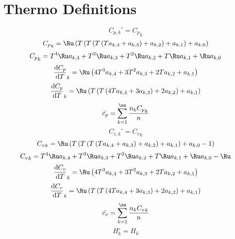 \documentclass[a4paper,10pt]{article}
\begin{document}
\section{Thermo Definitions}
\begin{dmath} {C_{p,k}}^{\circ} = {C_p}_{k}\end{dmath} 
\begin{dmath} {C_p}_{k} = \Ru \left(T \left(T \left(T \left(T a_{k,4} + a_{k,3}\right) + a_{k,2}\right) + a_{k,1}\right) + a_{k,0}\right)\end{dmath} 
\begin{dmath} {C_p}_{k} = T^{4} \Ru a_{k,4} + T^{3} \Ru a_{k,3} + T^{2} \Ru a_{k,2} + T \Ru a_{k,1} + \Ru a_{k,0}\end{dmath} 
\begin{dmath} \frac{\text{d} {C_p} }{\text{d} T }_{k} = \Ru \left(4 T^{3} a_{k,4} + 3 T^{2} a_{k,3} + 2 T a_{k,2} + a_{k,1}\right)\end{dmath} 
\begin{dmath} \frac{\text{d} {C_p} }{\text{d} T }_{k} = \Ru \left(T \left(T \left(4 T a_{k,4} + 3 a_{k,3}\right) + 2 a_{k,2}\right) + a_{k,1}\right)\end{dmath} 
\begin{dmath} \bar{c_p} = \sum_{k=1}^{\ns} \frac{n_{k} {C_p}_{k}}{n}\end{dmath} 
\begin{dmath} {C_{v,k}}^{\circ} = {C_v}_{k}\end{dmath} 
\begin{dmath} {C_v}_{k} = \Ru \left(T \left(T \left(T \left(T a_{k,4} + a_{k,3}\right) + a_{k,2}\right) + a_{k,1}\right) + a_{k,0} - 1\right)\end{dmath} 
\begin{dmath} {C_v}_{k} = T^{4} \Ru a_{k,4} + T^{3} \Ru a_{k,3} + T^{2} \Ru a_{k,2} + T \Ru a_{k,1} + \Ru a_{k,0} - \Ru\end{dmath} 
\begin{dmath} \frac{\text{d} {C_v} }{\text{d} T }_{k} = \Ru \left(4 T^{3} a_{k,4} + 3 T^{2} a_{k,3} + 2 T a_{k,2} + a_{k,1}\right)\end{dmath} 
\begin{dmath} \frac{\text{d} {C_v} }{\text{d} T }_{k} = \Ru \left(T \left(T \left(4 T a_{k,4} + 3 a_{k,3}\right) + 2 a_{k,2}\right) + a_{k,1}\right)\end{dmath} 
\begin{dmath} \bar{c_v} = \sum_{k=1}^{\ns} \frac{n_{k} {C_v}_{k}}{n}\end{dmath} 
\begin{dmath} H_k^{\circ} = H_{k}\end{dmath} 
\end{document}
